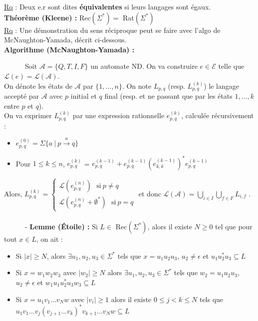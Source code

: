 \documentclass[11pt,a4paper]{article}
\begin{document}
\underline{Rq} : Deux e.r sont dites \textbf{équivalentes} si leurs langages sont égaux. \\

\textbf{Théorème (Kleene) :} Rec$(\Sigma^*) = $ Rat$(\Sigma^*)$ \\

\underline{Rq} : Une démonstration du sens réciproque peut se faire avec l'algo de McNaughton-Yamada, décrit ci-dessous. \\

\textbf{Algorithme (McNaughton-Yamada) :}

\ \ \ \ \ \ Soit $\mathcal{A} = \lbrace Q,T,I,F \rbrace $ un automate ND. On va construire $e\in \mathcal{E}$ telle que $\mathcal{L}(e)=\mathcal{L}(\mathcal{A})$. \\
On dénote les états de $\mathcal{A}$  par $\{1,\dots,n\}$. On note $L_{p,q}$ (resp. $L_{p,q}^{(k)}$) le langage accepté par $\mathcal{A}$ avec $p$ initial et $q$ final (resp. et ne passant que par les états $1,\dots, k$ entre $p$ et $q$). \\
On va exprimer $L_{p,q}^{(k)}$ par une expression rationnelle $e_{p,q}^{(k)}$, calculée récursivement :
\begin{itemize}
\item $e_{p,q}^{(0)} = \Sigma\{a \ | \ p \xrightarrow{a} q \}$
\item Pour $ 1 \leq k \leq n$, $e_{p,q}^{(k)}$ = $e_{p,q}^{(k-1)} + e_{p,q}^{(k-1)}(e_{k,k}^{(k-1)})^*e_{p,q}^{(k-1)}$ 
\end{itemize}
Alors, $L_{p,q}^{(k)} = \begin{cases} \mathcal{L}(e_{p,q}^{(n)}) \ \ \ \text{si} \ p \neq q \\ \mathcal{L}(e_{p,q}^{(n)} + \emptyset^*) \ \ \ \text{si} \ p = q \end{cases}$ et donc $\mathcal{L}(\mathcal{A})=\bigcup\limits_{i \in I}\bigcup\limits_{f \in F} L_{i,f}$ . \\ \\


\ \ \ \ \ \ - \textbf{Lemme (Étoile) :} Si $L \in$ Rec$(\Sigma^*)$, alors il existe $N \geq 0$ tel que pour tout $x \in L$, on ait :
\begin{itemize}
\item Si $|x| \geq N$, alors $\exists u_1, u_2, u_3 \in \Sigma^*$ tels que $x=u_1u_2u_3$, $u_2 \neq \epsilon$ et $u_1u_2^*u_3 \subseteq L$
\item Si $x=w_1w_2w_3$ avec $|w_2| \geq N$ alors $\exists u_1, u_2, u_3 \in \Sigma^*$ tels que $w_2=u_1u_2u_3$,$u_2 \neq \epsilon$ et $w_1u_1u_2^*u_3w_3\subseteq L$
\item Si $x=u_1v_1\dots v_Nw$ avec $|v_i| \geq 1$ alors il existe $0 \leq j < k \leq N$ tels que \\ $u_1v_1\dots v_j(v_{j+1}\dots v_k)^*v_{k+1}\dots v_Nw \subseteq L$ \\
\end{itemize}
\end{document}
